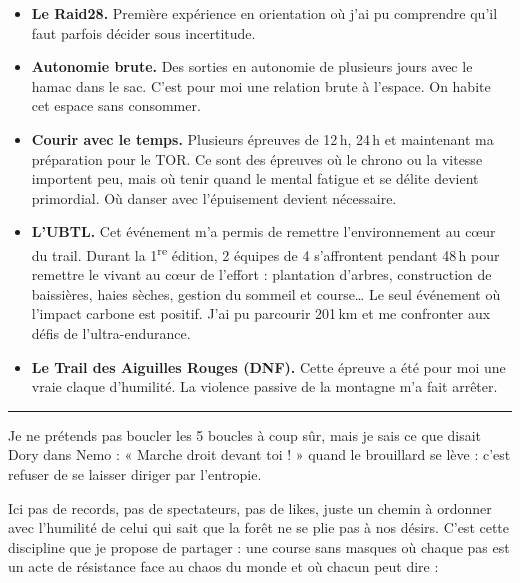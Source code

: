 \documentclass[10pt, a4paper, twocolumn]{article}
\begin{document}
\begin{itemize}[leftmargin=*, label=\textbullet, itemsep=0.5em]
    
    \item \textbf{Le Raid28.} Première expérience en orientation où j'ai pu comprendre qu'il faut parfois décider sous incertitude.
    
    \item \textbf{Autonomie brute.} Des sorties en autonomie de plusieurs jours avec le hamac dans le sac. C'est pour moi une relation brute à l'espace. On habite cet espace sans consommer.
    
    \item \textbf{Courir avec le temps.} Plusieurs épreuves de 12\,h, 24\,h et maintenant ma préparation pour le TOR. Ce sont des épreuves où le chrono ou la vitesse importent peu, mais où tenir quand le mental fatigue et se délite devient primordial. Où danser avec l'épuisement devient nécessaire.
    
    \item \textbf{L'UBTL.} Cet événement m'a permis de remettre l'environnement au cœur du trail. Durant la 1\textsuperscript{re} édition, 2 équipes de 4 s'affrontent pendant 48\,h pour remettre le vivant au cœur de l'effort : plantation d'arbres, construction de baissières, haies sèches, gestion du sommeil et course… Le seul événement où l'impact carbone est positif. J'ai pu parcourir 201\,km et me confronter aux défis de l'ultra-endurance.
    
    \item \textbf{Le Trail des Aiguilles Rouges (DNF).} Cette épreuve a été pour moi une vraie claque d'humilité. La violence passive de la montagne m'a fait arrêter.
    
\end{itemize}

\vspace{0.5cm}
\noindent\rule{0.4\linewidth}{0.5pt} %
\vspace{0.5cm}

Je ne prétends pas boucler les 5 boucles à coup sûr, mais je sais ce que disait Dory dans Nemo : « Marche droit devant toi ! » quand le brouillard se lève : c'est refuser de se laisser diriger par l'entropie. 

Ici pas de records, pas de spectateurs, pas de likes, juste un chemin à ordonner avec l'humilité de celui qui sait que la forêt ne se plie pas à nos désirs. C'est cette discipline que je propose de partager : une course sans masques où chaque pas est un acte de résistance face au chaos du monde et où chacun peut dire :
\end{document}
